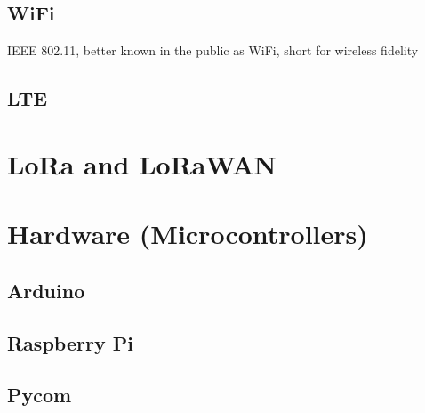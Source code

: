 		\subsection{WiFi}
		
		IEEE 802.11, better known in the public as WiFi, short for wireless fidelity
	
		\subsection{LTE}
	
	\section{LoRa and LoRaWAN}
	
	\section{Hardware (Microcontrollers)}
	
	\subsection{Arduino}
	
	\subsection{Raspberry Pi}
	
	\subsection{Pycom}